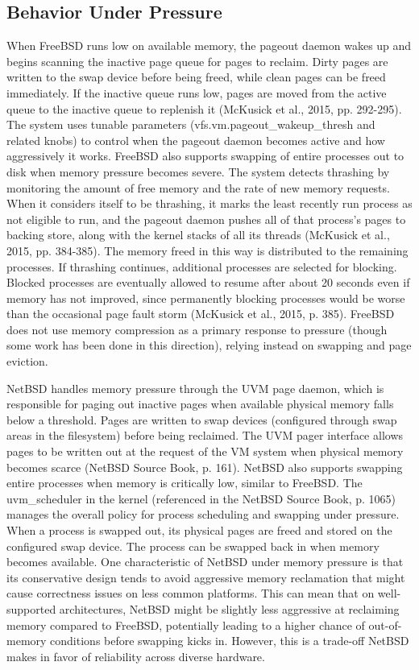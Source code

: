 \subsection{Behavior Under Pressure}
When FreeBSD runs low on available memory, the pageout daemon wakes up and begins scanning the inactive page queue for pages to reclaim. Dirty pages are written to the swap device before being freed, while clean pages can be freed immediately. If the inactive queue runs low, pages are moved from the active queue to the inactive queue to replenish it (McKusick et al., 2015, pp. 292-295). The system uses tunable parameters (vfs.vm.pageout\_wakeup\_thresh and related knobs) to control when the pageout daemon becomes active and how aggressively it works.
FreeBSD also supports swapping of entire processes out to disk when memory pressure becomes severe. The system detects thrashing by monitoring the amount of free memory and the rate of new memory requests. When it considers itself to be thrashing, it marks the least recently run process as not eligible to run, and the pageout daemon pushes all of that process's pages to backing store, along with the kernel stacks of all its threads (McKusick et al., 2015, pp. 384-385). The memory freed in this way is distributed to the remaining processes. If thrashing continues, additional processes are selected for blocking. Blocked processes are eventually allowed to resume after about 20 seconds even if memory has not improved, since permanently blocking processes would be worse than the occasional page fault storm (McKusick et al., 2015, p. 385).
FreeBSD does not use memory compression as a primary response to pressure (though some work has been done in this direction), relying instead on swapping and page eviction.

NetBSD handles memory pressure through the UVM page daemon, which is responsible for paging out inactive pages when available physical memory falls below a threshold. Pages are written to swap devices (configured through swap areas in the filesystem) before being reclaimed. The UVM pager interface allows pages to be written out at the request of the VM system when physical memory becomes scarce (NetBSD Source Book, p. 161).
NetBSD also supports swapping entire processes when memory is critically low, similar to FreeBSD. The uvm\_scheduler in the kernel (referenced in the NetBSD Source Book, p. 1065) manages the overall policy for process scheduling and swapping under pressure. When a process is swapped out, its physical pages are freed and stored on the configured swap device. The process can be swapped back in when memory becomes available.
One characteristic of NetBSD under memory pressure is that its conservative design tends to avoid aggressive memory reclamation that might cause correctness issues on less common platforms. This can mean that on well-supported architectures, NetBSD might be slightly less aggressive at reclaiming memory compared to FreeBSD, potentially leading to a higher chance of out-of-memory conditions before swapping kicks in. However, this is a trade-off NetBSD makes in favor of reliability across diverse hardware.

